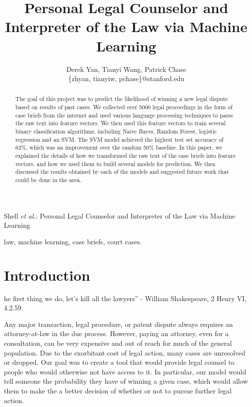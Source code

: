 \documentclass[journal]{IEEEtran}
\begin{document}
\title{Personal Legal Counselor and Interpreter of the Law via Machine Learning}
\author{Derek Yan, Tianyi Wang, Patrick Chase\\
\{zhyan, tianyiw, pchase\}@stanford.edu}
{Shell \MakeLowercase{\textit{et al.}}: Personal Legal Counselor and Interpreter of the Law via Machine Learning}
\maketitle

\begin{abstract}
The goal of this project was to predict the likelihood of winning a new legal dispute based on results of past cases. We collected over 5000 legal proceedings in the form of case briefs from the internet and used various language processing techniques to parse the raw text into feature vectors. We then used this feature vectors to train several binary classification algorithms, including Naive Bayes, Random Forest, logistic regression and an SVM. The SVM model achieved the highest test set accuracy of 62\%, which was an improvement over the random 50\% baseline. In this paper, we explained the details of how we transformed the raw text of the case briefs into feature vectors, and how we used them to build several models for prediction. We then discussed the results obtained by each of the models and suggested future work that could be done in the area.
\end{abstract}

\begin{keywords}
law, machine learning, case briefs, court cases.
\end{keywords}

\section{Introduction}
 he first thing we do, let's kill all the lawyers'' - William Shakespeare, 2 Henry VI, 4.2.59. 

Any major transaction, legal procedure, or patent dispute always requires an attorney-at-law in the due process. However, paying an attorney, even for a consultation, can be very expensive and out of reach for much of the general population. Due to the exorbitant cost of legal action, many cases are unresolved or dropped. Our goal was to create a tool that would provide legal counsel to people who would otherwise not have access to it. In particular, our model would tell someone the probability they have of winning a given case, which would allow them to make the a better decision of whether or not to pursue further legal action. 
\end{document}
